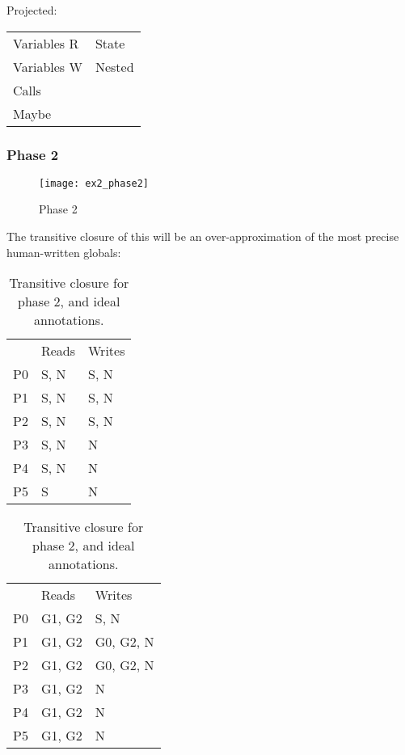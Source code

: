 \documentclass{article}
\begin{document}
\begin{description}
\begin{multicols}{2}
    Projected:
    \begin{tabular}{ll}
      Variables R & State \\
      Variables W & Nested \\
      Calls       & \\
      Maybe       & \\
    \end{tabular}
  \end{multicols}
\end{description}

\subsubsection{Phase 2}
\begin{figure}[h]
  \begin{center}
    \texttt{[image: ex2\_phase2]}
  \end{center}
  \caption{Phase 2}
\end{figure}

\noindent
The transitive closure of this will be an over-approximation of the most
precise human-written globals:

\begin{table}[h]
  \begin{center}
    \begin{multicols}{2}
      \begin{tabular}{lll}
           & Reads & Writes \\
        P0 & S, N  & S, N   \\
        P1 & S, N  & S, N   \\
        P2 & S, N  & S, N   \\
        P3 & S, N  & N      \\
        P4 & S, N  & N      \\
        P5 & S     & N      \\
      \end{tabular}

      \begin{tabular}{lll}
           & Reads     & Writes    \\
        P0 & G1, G2    & S, N      \\
        P1 & G1, G2    & G0, G2, N \\
        P2 & G1, G2    & G0, G2, N \\
        P3 & G1, G2    & N         \\
        P4 & G1, G2    & N         \\
        P5 & G1, G2    & N         \\
      \end{tabular}
    \end{multicols}
  \end{center}
  \caption{Transitive closure for phase 2, and ideal annotations.}
\end{table}
\end{document}
